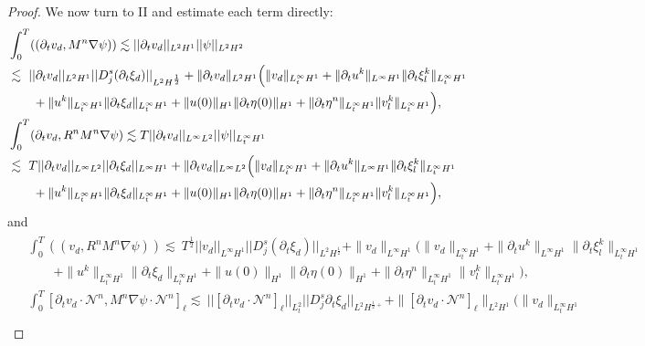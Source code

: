 \documentclass[letterpaper,reqno,10pt,twoside]{amsart}
\theoremstyle{definition}
\theoremstyle{remark}
\def\p{\partial}
\begin{document}
\begin{proof}
		We now turn to II and estimate each term directly:
		\begin{align}
			&\int_{0}^{T} ((\partial_{t}v_{d},M^{n}\nabla \psi))\lesssim\vert \vert \partial_{t}v_{d}\vert \vert_{L^{2}H^{1}}\vert \vert \psi\vert \vert_{L^{2}H^{2}}\\
			&\lesssim\ \vert \vert \partial_{t}v_{d}\vert \vert_{L^{2}H^{1}}\vert \vert D_{j}^{s}(\partial_{t}\xi_{d})\vert \vert_{L^{2}H^{\frac{1}{2}}}+\|\p_{t}v_{d}\|_{L^{2}H^{1}}\Big(\|v_{d}\|_{L_{t}^{\infty}H^{1}}+\|\p_{t}u^{k}\|_{L^{\infty}H^{1}}\|\p_{t}\xi_{l}^{k}\|_{L_{t}^{\infty}H^{1}}\notag\\
			&\qquad+\|u^{k}\|_{L_{t}^{\infty}H^{1}}\|\p_{t}\xi_{d}\|_{L_{t}^{\infty}H^{1}}+\|u(0)\|_{H^{1}}\|\p_{t}\eta(0)\|_{H^{1}}+\|\p_{t}\eta^{n}\|_{L_{t}^{\infty}H^{1}}\|v_{l}^{k}\|_{L_{t}^{\infty}H^{1}}\Big),\notag\\
			&\int_{0}^{T}(\partial_{t}v_{d},R^{n}M^{n}\nabla \psi)\lesssim T\vert \vert \partial_{t}v_{d}\vert \vert_{L^{\infty}L^{2}}\vert \vert \psi\vert \vert_{L_{t}^{\infty}H^{1}}\\
			&\lesssim\ T\vert \vert \partial_{t}v_{d}\vert \vert_{L^{\infty}L^{2}}\vert \vert \partial_{t}\xi_{d}\vert \vert_{L^{\infty}H^{1}}+\|\p_{t}v_{d}\|_{L^{\infty}L^{2}}\Big(\|v_{d}\|_{L_{t}^{\infty}H^{1}}+\|\p_{t}u^{k}\|_{L^{\infty}H^{1}}\|\p_{t}\xi_{l}^{k}\|_{L_{t}^{\infty}H^{1}}\notag\\
			&\qquad+\|u^{k}\|_{L_{t}^{\infty}H^{1}}\|\p_{t}\xi_{d}\|_{L_{t}^{\infty}H^{1}}+\|u(0)\|_{H^{1}}\|\p_{t}\eta(0)\|_{H^{1}}+\|\p_{t}\eta^{n}\|_{L_{t}^{\infty}H^{1}}\|v_{l}^{k}\|_{L_{t}^{\infty}H^{1}}\Big),\notag
		\end{align}
		and
		\begin{align}
			\begin{aligned}
				&\int_{0}^{T}((v_{d},R^{n}M^{n}\nabla \psi)) \lesssim\ T^{\frac{1}{2}}\vert \vert v_{d}\vert \vert_{L^{\infty}H^{1}}\vert \vert D_{j}^{s}(\partial_{t}\xi_{d})\vert \vert_{L^{2}H^{\frac{1}{2}}}+\|v_{d}\|_{L^{\infty}H^{1}}\big(\|v_{d}\|_{L_{t}^{\infty}H^{1}}+\|\p_{t}u^{k}\|_{L^{\infty}H^{1}}\|\p_{t}\xi_{l}^{k}\|_{L_{t}^{\infty}H^{1}}\\
				&\qquad+\|u^{k}\|_{L_{t}^{\infty}H^{1}}\|\p_{t}\xi_{d}\|_{L_{t}^{\infty}H^{1}}+\|u(0)\|_{H^{1}}\|\p_{t}\eta(0)\|_{H^{1}}+\|\p_{t}\eta^{n}\|_{L_{t}^{\infty}H^{1}}\|v_{l}^{k}\|_{L_{t}^{\infty}H^{1}}\big),\\
				&\int_{0}^{T}[\partial_{t}v_{d}\cdot \mathcal{N}^{n},M^{n}\nabla \psi\cdot \mathcal{N}^{n}]_{\ell}\lesssim\ \vert \vert [\partial_{t}v_{d}\cdot \mathcal{N}^{n}]_{\ell}\vert \vert_{L_{t}^{2}}\vert \vert D_{j}^{s}\partial_{t}\xi_{d}\vert \vert_{L^{2}H^{\frac{1}{2}+}}+\|[\p_{t}v_{d}\cdot \mathcal{N}^{n}]_{\ell}\|_{L^{2}H^{1}}\big(\|v_{d}\|_{L_{t}^{\infty}H^{1}}\\

\end{aligned}
\end{align}
\end{proof}
\end{document}
